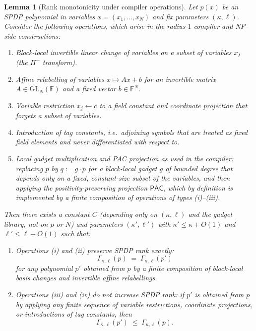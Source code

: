 \documentclass[12pt]{article}
\newtheorem{lemma}[theorem]{Lemma}
\theoremstyle{definition}
\theoremstyle{definition}
\theoremstyle{remark}
\theoremstyle{remark}
\begin{document}
\begin{lemma}[Rank monotonicity under compiler operations]
\label{lem:rank-monotonicity-compiler}
Let $p(x)$ be an SPDP polynomial in variables $x=(x_1,\dots,x_N)$ and fix
parameters $(\kappa,\ell)$. Consider the following operations, which arise in
the radius-$1$ compiler and NP-side constructions:
\begin{enumerate}[label=(\roman*)]
  \item \emph{Block-local invertible linear change of variables} on a
  subset of variables $x_I$ (the $\Pi^+$ transform).

  \item \emph{Affine relabelling} of variables $x \mapsto A x + b$ for an
  invertible matrix $A \in \mathrm{GL}_N(\mathbb{F})$ and a fixed vector
  $b \in \mathbb{F}^N$.

  \item \emph{Variable restriction} $x_j \gets c$ to a field constant and
  \emph{coordinate projection} that forgets a subset of variables.

  \item \emph{Introduction of tag constants}, i.e.\ adjoining symbols
  that are treated as fixed field elements and never differentiated with
  respect to.

  \item \emph{Local gadget multiplication and PAC projection} as used in
  the compiler: replacing $p$ by $q := g\cdot p$ for a block-local gadget
  $g$ of bounded degree that depends only on a fixed, constant-size subset
  of the variables, and then applying the positivity-preserving projection
  $\mathsf{PAC}$, which by definition is implemented by a finite
  composition of operations of types \textup{(i)}--\textup{(iii)}.
\end{enumerate}
Then there exists a constant $C$ (depending only on $(\kappa,\ell)$ and the
gadget library, not on $p$ or $N$) and parameters $(\kappa',\ell')$ with
$\kappa'\le \kappa+O(1)$ and $\ell'\le \ell+O(1)$ such that:
\begin{enumerate}[label=(\alph*)]
  \item Operations \textup{(i)} and \textup{(ii)} preserve SPDP rank
  exactly:
  \[
     \Gamma_{\kappa,\ell}(p) \;=\; \Gamma_{\kappa,\ell}(p')
  \]
  for any polynomial $p'$ obtained from $p$ by a finite composition of
  block-local basis changes and invertible affine relabellings.

  \item Operations \textup{(iii)} and \textup{(iv)} do not increase SPDP
  rank: if $p'$ is obtained from $p$ by applying any finite sequence of
  variable restrictions, coordinate projections, or introductions of tag
  constants, then
  \[
     \Gamma_{\kappa,\ell}(p') \;\le\; \Gamma_{\kappa,\ell}(p).
  \]


\end{enumerate}
\end{lemma}
\end{document}
